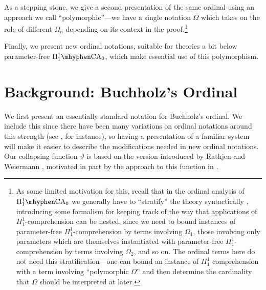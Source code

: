 \documentclass[11pt]{amsart}
\theoremstyle{definition}
\begin{document}
As a stepping stone, we give a second presentation of the same ordinal using an approach we call ``polymorphic''---we have a single notation $\Omega$ which takes on the role of different $\Omega_n$ depending on its context in the proof.\footnote{As some limited motivation for this, recall that in the ordinal analysis of $\Pi^1_1\mhyphen\mathrm{CA}_0$ we generally have to ``stratify'' the theory syntactically \cite{MR635488,akiyoshi2017ordinal}, introducing some formalism for keeping track of the way that applications of $\Pi^1_1$-comprehension can be nested, since we need to bound instances of parameter-free $\Pi^1_1$-comprehension by terms involving $\Omega_1$, those involving only parameters which are themselves instantiated with parameter-free $\Pi^1_1$-comprehension by terms involving $\Omega_2$, and so on. The ordinal terms here do not need this stratification---one can bound an instance of $\Pi^1_1$ comprehension with a term involving ``polymorphic $\Omega$'' and then determine the cardinality that $\Omega$ should be interpreted at later.}

Finally, we present new ordinal notations, suitable for theories a bit below parameter-free $\Pi^1_1\mhyphen\mathrm{CA}_0$, which make essential use of this polymorphism.

\section{Background: Buchholz's Ordinal}

We first present an essentially standard notation for Buchholz's ordinal. We include this since there have been many variations on ordinal notations around this strength (see \cite{MR3525540}, for instance), so having a presentation of a familiar system will make it easier to describe the modifications needed in new ordinal notations. Our collapsing function $\vartheta$ is based on the version introduced by Rathjen and Weiermann \cite{rathjen:MR1212407}, motivated in part by the approach to this function in \cite{MR4594953,MR3994445}.
\end{document}
